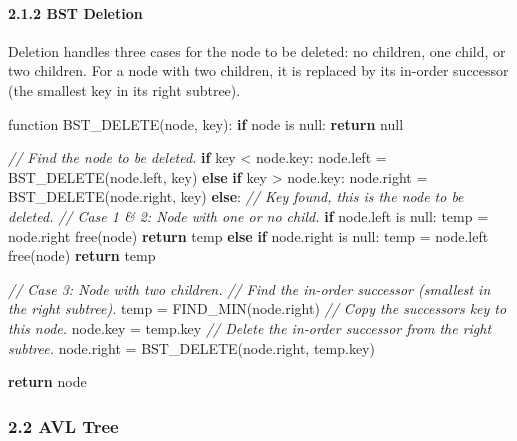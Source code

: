 \documentclass[
]{article}
\newenvironment{Shaded}{}{}
\newcommand{\CommentTok}[1]{\textcolor[rgb]{0.38,0.63,0.69}{\textit{#1}}}
\newcommand{\ControlFlowTok}[1]{\textcolor[rgb]{0.00,0.44,0.13}{\textbf{#1}}}
\newcommand{\NormalTok}[1]{#1}
\begin{document}
\hypertarget{bst-deletion}{%
\paragraph{2.1.2 BST Deletion}\label{bst-deletion}}

Deletion handles three cases for the node to be deleted: no children,
one child, or two children. For a node with two children, it is replaced
by its in-order successor (the smallest key in its right subtree).

\begin{pcode}

\begin{Shaded}
\begin{Highlighting}[]
\NormalTok{function BST\_DELETE(node, key):}
  \ControlFlowTok{if}\NormalTok{ node is null: }\ControlFlowTok{return}\NormalTok{ null}

  \CommentTok{// Find the node to be deleted.}
  \ControlFlowTok{if}\NormalTok{ key \textless{} node.key:}
\NormalTok{    node.left = BST\_DELETE(node.left, key)}
  \ControlFlowTok{else} \ControlFlowTok{if}\NormalTok{ key \textgreater{} node.key:}
\NormalTok{    node.right = BST\_DELETE(node.right, key)}
  \ControlFlowTok{else}\NormalTok{: }\CommentTok{// Key found, this is the node to be deleted.}
    \CommentTok{// Case 1 \& 2: Node with one or no child.}
    \ControlFlowTok{if}\NormalTok{ node.left is null:}
\NormalTok{      temp = node.right}
\NormalTok{      free(node)}
      \ControlFlowTok{return}\NormalTok{ temp}
    \ControlFlowTok{else} \ControlFlowTok{if}\NormalTok{ node.right is null:}
\NormalTok{      temp = node.left}
\NormalTok{      free(node)}
      \ControlFlowTok{return}\NormalTok{ temp}
    
    \CommentTok{// Case 3: Node with two children.}
    \CommentTok{// Find the in{-}order successor (smallest in the right subtree).}
\NormalTok{    temp = FIND\_MIN(node.right)}
    \CommentTok{// Copy the successor\textquotesingle{}s key to this node.}
\NormalTok{    node.key = temp.key}
    \CommentTok{// Delete the in{-}order successor from the right subtree.}
\NormalTok{    node.right = BST\_DELETE(node.right, temp.key)}
  
  \ControlFlowTok{return}\NormalTok{ node}
\end{Highlighting}
\end{Shaded}

\end{pcode}

\hypertarget{avl-tree}{%
\subsubsection{2.2 AVL Tree}\label{avl-tree}}
\end{document}
